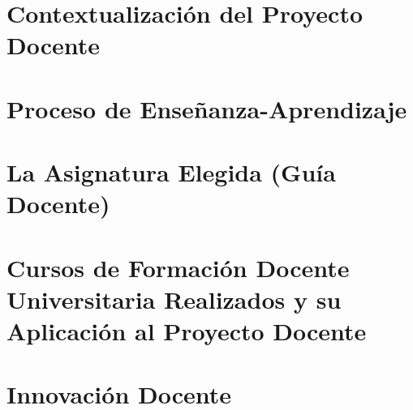 \documentclass[conrubrica]{ubu}
\begin{document}
\portada

\chapter{Contextualización del Proyecto Docente}

\chapter{Proceso de Enseñanza-Aprendizaje}

\chapter{La Asignatura Elegida (Guía Docente)}

\chapter{Cursos de Formación Docente Universitaria Realizados y su Aplicación al Proyecto Docente}

\chapter{Innovación Docente}
\end{document}
